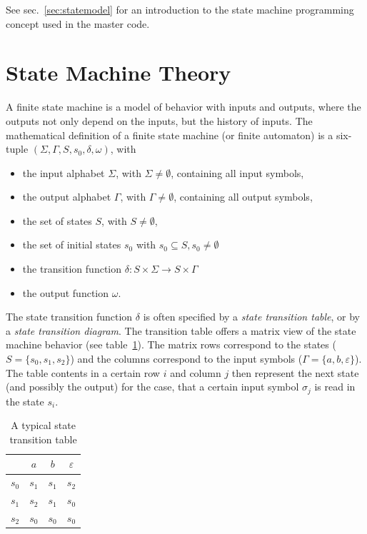\documentclass[a4paper,12pt,BCOR6mm,bibtotoc,idxtotoc]{scrbook}
\begin{document}
See sec.~\ref{sec:statemodel} for an introduction to the state machine
programming concept used in the master code.


\section{State Machine Theory}
\label{sec:fsmtheory}

A finite state machine \cite{automata} is a model of behavior with
inputs and outputs, where the outputs not only depend on the inputs,
but the history of inputs. The mathematical definition of a finite
state machine (or finite automaton) is a six-tuple $(\Sigma, \Gamma,
S, s_0, \delta, \omega)$, with

\begin{itemize}
\item the input alphabet $\Sigma$, with $\Sigma \neq
  \emptyset$, containing all input symbols,
\item the output alphabet $\Gamma$, with $\Gamma \neq
  \emptyset$, containing all output symbols,
\item the set of states $S$, with $S \neq \emptyset$,
\item the set of initial states $s_0$ with $s_0 \subseteq S, s_0 \neq
  \emptyset$
\item the transition function $\delta: S \times \Sigma \rightarrow S
  \times \Gamma$
\item the output function $\omega$.
\end{itemize}

The state transition function $\delta$ is often specified by a
\textit{state transition table}, or by a \textit{state transition
  diagram}. The transition table offers a matrix view of the state
machine behavior (see table~\ref{tab:statetrans}). The matrix rows
correspond to the states ($S = \{s_0, s_1, s_2\}$) and the columns
correspond to the input symbols ($\Gamma = \{a, b, \varepsilon\}$).
The table contents in a certain row $i$ and column $j$ then represent
the next state (and possibly the output) for the case, that a certain
input symbol $\sigma_j$ is read in the state $s_i$.

\begin{table}[htbp]
  \caption{A typical state transition table}
  \label{tab:statetrans}
  \vspace{2mm}
  \centering
  \begin{tabular}{l|ccc}
    & $a$ & $b$ & $\varepsilon$\\ \hline
    $s_0$ & $s_1$ & $s_1$ & $s_2$\\
    $s_1$ & $s_2$ & $s_1$ & $s_0$\\
    $s_2$ & $s_0$ & $s_0$ & $s_0$\\ \hline
  \end{tabular}
\end{table}
\end{document}

